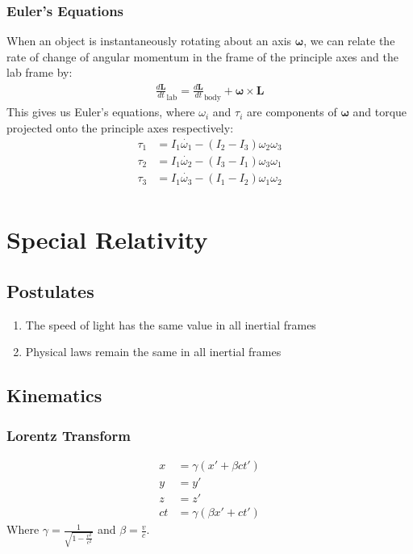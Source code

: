 \documentclass[a4paper]{article}
\newcommand{\ve}[1]{
  \ensuremath{\bm{#1}}}	               %
\begin{document}
\begin{multicols*}{2}
\subsubsection{Euler's Equations}
When an object is instantaneously rotating about an axis $\ve{\omega}$, we can
relate the rate of change of angular momentum in the frame of the principle axes
and the lab frame by:
\begin{align*}
  \frac{d\ve{L}}{dt}_\text{lab} = \frac{d\ve{L}}{dt}_\text{body} + \ve{\omega}
  \times \ve{L}
\end{align*}
This gives us Euler's equations, where $\omega_i$ and $\tau_i$ are components of
$\ve{\omega}$ and torque projected onto the principle axes respectively:
\begin{align*}
  \tau_1 &= I_1\dot{\omega_1} - (I_2 - I_3)\omega_2\omega_3 \\
  \tau_2 &= I_1\dot{\omega_2} - (I_3 - I_1)\omega_3\omega_1 \\
  \tau_3 &= I_1\dot{\omega_3} - (I_1 - I_2)\omega_1\omega_2 \\
\end{align*}
\section{Special Relativity}
\subsection{Postulates}
\begin{enumerate}
\item The speed of light has the same value in all inertial frames
\item Physical laws remain the same in all inertial frames
\end{enumerate}
\subsection{Kinematics}
\subsubsection{Lorentz Transform}
\begin{align*}
  x&= \gamma (x' + \beta ct') \\
  y&=y' \\
  z&=z' \\
  ct&= \gamma (\beta x' + ct')
\end{align*}
Where $\gamma = \frac{1}{\sqrt{1-\frac{v^2}{c^2}}}$ and $\beta = \frac{v}{c}$.

\end{multicols*}
\end{document}
